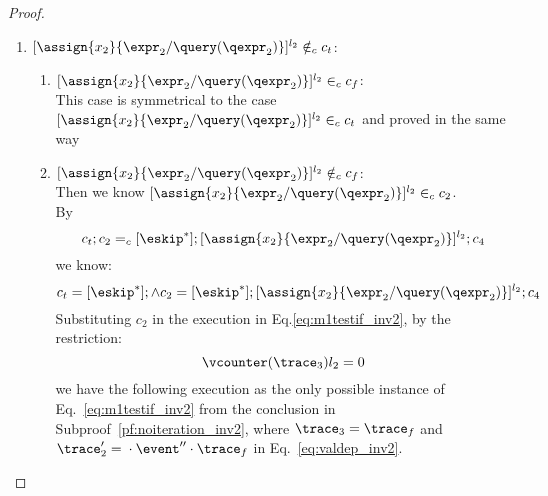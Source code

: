 {\begin{proof}
\begin{case}[$\trace_2 = \trace_{ih} \cdot \event_{ih}$]
\begin{subproof}
\begin{enumerate}
we know $\forall \trace, \trace' \in \mathcal{T}$, there doesn't exist execution
 \[
  \config{c_f;c_2, \vtrace} \rightarrow^{*} 
  \config{[\assign{{x}_2}{\expr_2 / \query(\qexpr_2)}]^{l_2};{c}_4', \trace'}
 \]
 This is contradict to the existence of execution in Eq.\ref{eq:m1testif_inv2}.
 \\
 If $[\assign{{x}_2}{\expr_2 / \query(\qexpr_2)}]^{l_2} \in_c c_2$, 
 by uniqueness of label , 
 it must exist in the body of a while command in $c_2$,
 and $\eif ([b]^{l_b}, c_t, c_f) \in_c c_2$ and $[\assign{{x}_2}{\expr_2 / \query(\qexpr_2)}]^{l_2} \in_c c_t$. 
\\
%
i.e., $[\assign{{x}_2}{\expr_2 / \query(\qexpr_2)}]^{l_2}$ will only show up in $c_t$.
\\
%
By $\flowsto$ definition, we have:
\[
  \forall z_i^{r_i} \in \lvar_{c_t},  x_j^{l_j} \in \lvar_c \st x_j \in VAR(b) \land x_j^{l_j} \in \live^{l_b}(c) \implies
  \flowsto(x_j^{l_j}, z_i^{r_i}, c)
\]
%
Since $x_1 \in VAR(b)$ and $x_1^{l_1} \in \live^{l_b}(c)$, we know:
%
\[
\flowsto(x_1^{l_1}, x_2^{l_2}, c)
\]
%
i.e.,
\[
\Big(\exists z_1^{r_1}, \cdots, z_n^{r_n} \in \lvar_{{c}} \st 0 \leq n 
 \land \flowsto(x_1^{l_1}, z_1^{r_1}, c) \land \cdots \land \flowsto(z_n^{r_n}, {x}_2^{l_2}, c) \Big)
\]
%
This case is proved.
\item $[\assign{{x}_2}{\expr_2 / \query(\qexpr_2)}]^{l_2} \notin_c c_t$:
\begin{enumerate}
 \item $[\assign{{x}_2}{\expr_2 / \query(\qexpr_2)}]^{l_2} \in_c c_f$:
 \\
 This case is symmetrical to the case $[\assign{{x}_2}{\expr_2 / \query(\qexpr_2)}]^{l_2} \in_c c_t$ and proved in the same way
 \item $[\assign{{x}_2}{\expr_2 / \query(\qexpr_2)}]^{l_2} \notin_c c_f$:
 \\
 Then we know $[\assign{{x}_2}{\expr_2 / \query(\qexpr_2)}]^{l_2} \in_c c_2$.
 \\
 By
 \[
  c_t;c_2 =_c [\eskip^*]; [\assign{{x}_2}{\expr_2 / \query(\qexpr_2)}]^{l_2};{c}_4
\]
we know:
\[
  c_t = [\eskip^*]; \land c_2 = [\eskip^*]; [\assign{{x}_2}{\expr_2 / \query(\qexpr_2)}]^{l_2};{c}_4
\]
Substituting $c_2$ in the execution in Eq.\ref{eq:m1testif_inv2}, by the restriction:
\[
  \vcounter(\trace_3)l_2 = 0
\]
we have the following execution as the only possible instance of Eq.~\ref{eq:m1testif_inv2} from the conclusion in Subproof~\ref{pf:noiteration_inv2}, where $\trace_3 = \trace_f$ 
and $\trace_2' = {} \cdot {} \event'' \cdot \trace_f$ in Eq.~\ref{eq:valdep_inv2}.

\end{enumerate}
\end{enumerate}
\end{subproof}
\end{case}
\end{proof}}
